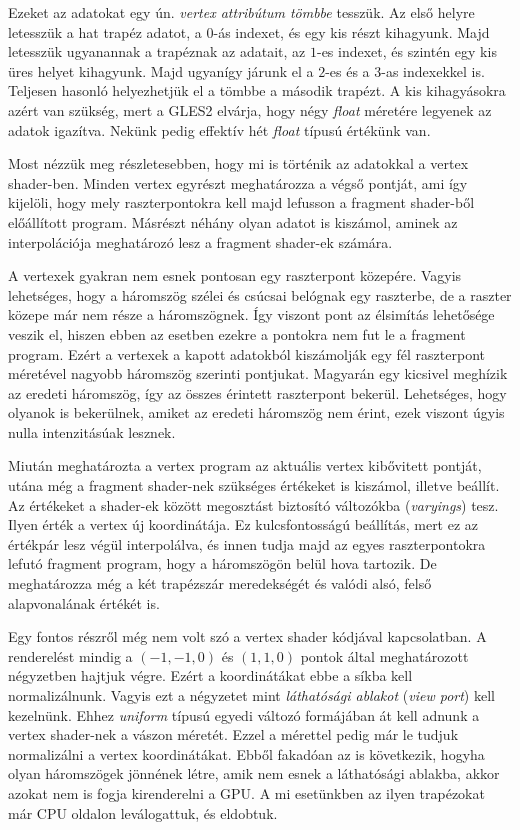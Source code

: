 \documentclass[12pt]{report}
\theoremstyle{definition}
\newcommand{\inenglish}[1]{\textsl{#1}}
\newcommand{\func}[1]{{\textsl{#1}}}
\begin{document}
Ezeket az adatokat egy ún. \emph{vertex attribútum tömbbe} tesszük. Az első
helyre letesszük a hat trapéz adatot, a $0$-ás indexet, és egy kis részt
kihagyunk. Majd letesszük ugyanannak a trapéznak az adatait, az $1$-es indexet,
és szintén egy kis üres helyet kihagyunk. Majd ugyanígy járunk el a $2$-es és a
$3$-as indexekkel is. Teljesen hasonló helyezhetjük el a tömbbe a második
trapézt. A kis kihagyásokra azért van szükség, mert a GLES2 elvárja, hogy négy
\func{float} méretére legyenek az adatok igazítva. Nekünk pedig effektív hét
\func{float} típusú értékünk van.

Most nézzük meg részletesebben, hogy mi is történik az adatokkal a vertex
shader-ben. Minden vertex egyrészt meghatározza a végső pontját, ami így
kijelöli, hogy mely raszterpontokra kell majd lefusson a fragment shader-ből
előállított program. Másrészt néhány olyan adatot is kiszámol, aminek az
interpolációja meghatározó lesz a fragment shader-ek számára.

A vertexek gyakran nem esnek pontosan egy raszterpont közepére. Vagyis
lehetséges, hogy a háromszög szélei és csúcsai belógnak egy raszterbe, de a
raszter közepe már nem része a háromszögnek. Így viszont pont az élsimítás
lehetősége veszik el, hiszen ebben az esetben ezekre a pontokra nem fut le a
fragment program. Ezért a vertexek a kapott adatokból kiszámolják egy fél
raszterpont méretével nagyobb háromszög szerinti pontjukat. Magyarán egy
kicsivel meghízik az eredeti háromszög, így az összes érintett raszterpont
bekerül. Lehetséges, hogy olyanok is bekerülnek, amiket az eredeti háromszög
nem érint, ezek viszont úgyis nulla intenzitásúak lesznek.

Miután meghatározta a vertex program az aktuális vertex kibővitett pontját,
utána még a fragment shader-nek szükséges értékeket is kiszámol, illetve
beállít. Az értékeket a shader-ek között megosztást biztosító változókba
(\inenglish{varyings}) tesz. Ilyen érték a vertex új koordinátája. Ez
kulcsfontosságú beállítás, mert ez az értékpár lesz végül interpolálva, és
innen tudja majd az egyes raszterpontokra lefutó fragment program, hogy a
háromszögön belül hova tartozik. De meghatározza még a két trapézszár
meredekségét és valódi alsó, felső alapvonalának értékét is.

Egy fontos részről még nem volt szó a vertex shader kódjával kapcsolatban. A
renderelést mindig a $(-1, -1, 0)$ és $(1, 1, 0)$ pontok által meghatározott
négyzetben hajtjuk végre. Ezért a koordinátákat ebbe a síkba kell
normalizálnunk. Vagyis ezt a négyzetet mint \emph{láthatósági ablakot}
(\inenglish{view port}) kell kezelnünk. Ehhez \func{uniform} típusú egyedi
változó formájában át kell adnunk a vertex shader-nek a vászon méretét. Ezzel a
mérettel pedig már le tudjuk normalizálni a vertex koordinátákat. Ebből
fakadóan az is következik, hogyha olyan háromszögek jönnének létre, amik nem
esnek a láthatósági ablakba, akkor azokat nem is fogja kirenderelni a GPU. A mi
esetünkben az ilyen trapézokat már CPU oldalon leválogattuk, és eldobtuk.
\end{document}
